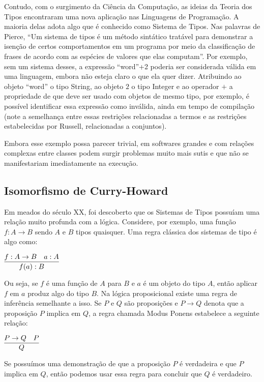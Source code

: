 \documentclass[12pt, oneside, a4paper,english,brazil]{abntex2}
\begin{document}
\qquad Contudo, com o surgimento da Ciência da Computação, as ideias da Teoria dos Tipos
encontraram uma nova aplicação nas Linguagens de Programação. A maioria delas adota
algo que é conhecido como Sistema de Tipos. Nas palavras de Pierce\cite{pierce}, ``Um sistema de
tipos é um método sintático tratável para demonstrar a isenção de certos comportamentos
em um programa por meio da classificação de frases de acordo com as espécies de valores
que elas computam''. Por exemplo, sem um sistema desses, a expressão ``word''+2 poderia
ser considerada válida em uma linguagem, embora não esteja claro o que ela quer dizer.
Atribuindo ao objeto ``word'' o tipo String, ao objeto $2$ o tipo Integer e ao operador
$+$ a propriedade de que deve ser usado com objetos de mesmo tipo, por exemplo, é
possível identificar essa expressão como inválida, ainda em tempo de compilação (note a
semelhança entre essas restrições relacionadas a termos e as restrições estabelecidas por
Russell, relacionadas a conjuntos).

\qquad Embora esse exemplo possa parecer trivial, em softwares grandes e com relações
complexas entre classes podem surgir problemas muito mais sutis e que não se manifestariam
imediatamente na execução.

\subsection*{Isomorfismo de Curry-Howard}
\qquad Em meados do século XX, foi descoberto que os Sistemas de Tipos possuíam uma
relação muito profunda com a lógica. Considere, por exemplo, uma função $f : A \rightarrow B$
sendo $A$ e $B$ tipos quaisquer. Uma regra clássica dos sistemas de tipo é algo como:

\begin{center}
  $\infer{f(a) : B}{f : A \rightarrow B & a : A}$
\end{center}

\qquad Ou seja, se $f$ é uma função de $A$ para $B$ e $a$ é um objeto do tipo $A$, então aplicar
$f$ em $a$ produz algo do tipo $B$. Na lógica proposicional existe uma regra de inferência
semelhante a isso. Se $P$ e $Q$ são proposições e $P \rightarrow Q$ denota que a proposição $P$ implica
em $Q$, a regra chamada Modus Ponens estabelece a seguinte relação:

\begin{center}
  $\infer{Q}{P \rightarrow Q & P}$
\end{center}

\qquad Se possuímos uma demonstração de que a proposição $P$ é verdadeira e que $P$
implica em $Q$, então podemos usar essa regra para concluir que $Q$ é verdadeiro.
\end{document}
